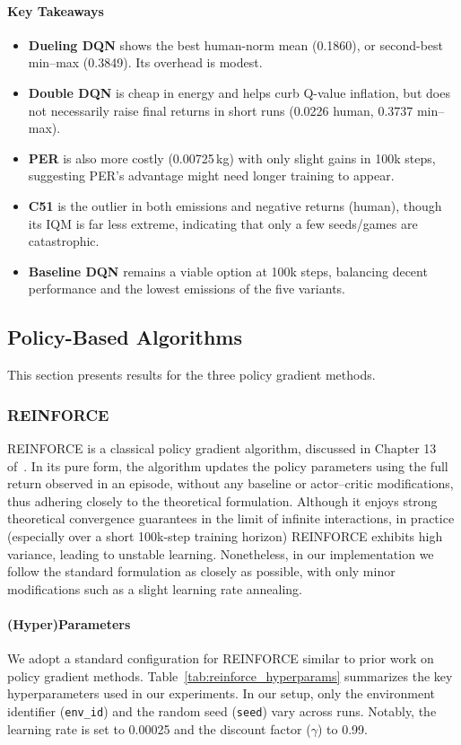 \paragraph{Key Takeaways}
\begin{itemize}
	\item \textbf{Dueling DQN} shows the best human-norm mean (0.1860), 
	or second-best min--max (0.3849). Its overhead is modest.
	\item \textbf{Double DQN} is cheap in energy and helps curb Q-value inflation, 
	but does not necessarily raise final returns in short runs (0.0226 human, 0.3737 min--max).
	\item \textbf{PER} is also more costly (0.00725\,kg) with only slight gains in 100k steps, 
	suggesting PER’s advantage might need longer training to appear.
	\item \textbf{C51} is the outlier in both emissions and negative returns (human), 
	though its IQM is far less extreme, indicating that only a few seeds/games are catastrophic.
	\item \textbf{Baseline DQN} remains a viable option at 100k steps, 
	balancing decent performance and the lowest emissions of the five variants.
\end{itemize}


\subsection{Policy-Based Algorithms}
This section presents results for the three policy gradient methods.

\subsubsection{REINFORCE}
\label{subsubsec:reinforce}
REINFORCE is a classical policy gradient algorithm, discussed in Chapter 13 of~\cite{sutton:rl}. In its pure form, the algorithm updates the policy parameters using the full return observed in an episode, without any baseline or actor–critic modifications, thus adhering closely to the theoretical formulation. Although it enjoys strong theoretical convergence guarantees in the limit of infinite interactions, in practice (especially over a short 100k-step training horizon) REINFORCE exhibits high variance, leading to unstable learning. Nonetheless, in our implementation we follow the standard formulation as closely as possible, with only minor modifications such as a slight learning rate annealing. 

\paragraph{(Hyper)Parameters}
We adopt a standard configuration for REINFORCE similar to prior work on policy gradient methods. Table~\ref{tab:reinforce_hyperparams} summarizes the key hyperparameters used in our experiments. In our setup, only the environment identifier (\texttt{env\_id}) and the random seed (\texttt{seed}) vary across runs. Notably, the learning rate is set to \num{0.00025} and the discount factor (\(\gamma\)) to \num{0.99}.

